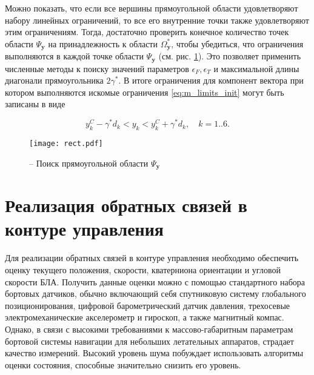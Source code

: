 Можно показать, что если все вершины прямоугольной области удовлетворяют набору линейных ограничений, то все его внутренние точки также удовлетворяют этим ограничениям. Тогда, достаточно проверить конечное количество точек области $\Psi_{\bm y}$ на принадлежность к области $\Omega^*_{\bm y}$, чтобы убедиться, что ограничения выполняются в каждой точке области $\Psi_{\bm y}$ (см. рис. \ref{fig:reqct_finding}). Это позволяет применить численные методы к поиску значений параметров $\epsilon_F, \epsilon_T$ и максимальной длины диагонали прямоугольника $2\gamma^*$. В итоге ограничения для компонент вектора  при котором выполняются искомые ограничения \eqref{eq:m_limits_init} могут быть записаны в виде

\begin{equation} \label{eq:lims_final}
y^C_k - \gamma^* d_k < y_k < y^C_k + \gamma^* d_k, \quad k = 1 .. 6.
\end{equation}

\begin{figure}[h!]
	\centering
	\texttt{[image: rect.pdf]}
	\caption{ -- Поиск прямоугольной области $\Psi_{\boldsymbol{y}}$}
	\label{fig:reqct_finding}
\end{figure}

\section{Реализация обратных связей в контуре управления}

Для реализации обратных связей в контуре управления необходимо обеспечить оценку текущего положения, скорости, кватерниона ориентации и угловой скорости БЛА. Получить данные оценки можно с помощью стандартного набора бортовых датчиков, обычно включающий себя спутниковую систему глобального позиционирования, цифровой барометрический датчик давления, трехосевые электромеханические акселерометр и гироскоп, а также магнитный компас. Однако, в связи с высокими требованиями к массово-габаритным параметрам бортовой системы навигации для небольших летательных аппаратов, страдает качество измерений. Высокий уровень шума побуждает использовать алгоритмы оценки состояния, способные значительно снизить его уровень.

